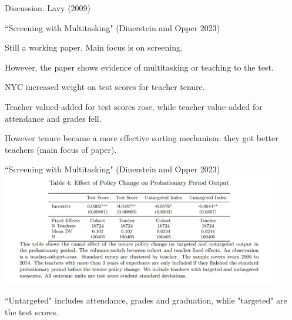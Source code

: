 \documentclass[aspectratio=169,usenames,dvipsnames]{beamer}
\newenvironment{wideitemize}{\itemize\addtolength{\itemsep}{10pt}}{\enditemize}
\begin{document}
\begin{frame}
\centering
    \huge Discussion: Lavy (2009)

\end{frame}



\begin{frame}{``Screening with Multitasking" (Dinerstein and Opper 2023)}
 \begin{wideitemize}
     \item Still a working paper. Main focus is on screening.
     \item However, the paper shows evidence of multitasking or teaching to the test.
     \item NYC increased weight on test scores for teacher tenure.
     \item Teacher valued-added for test scores rose, while teacher value-added for attendance and grades fell.
     \item However tenure became a more effective sorting mechanism: they got better teachers (main focus of paper).
 \end{wideitemize}

\end{frame}


\begin{frame}[c]{``Screening with Multitasking" (Dinerstein and Opper 2023)}
\centering
\includegraphics[width=0.9\textwidth]{pictures/teacher_multitasking.png}

``Untargeted" includes attendance, grades and graduation, while "targeted" are the test scores.
\end{frame}

       
\end{document}

